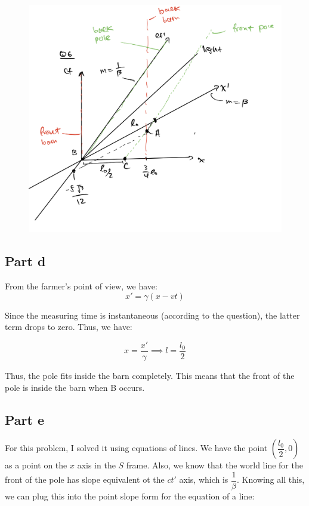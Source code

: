\documentclass{article}
\theoremstyle{definition}
\numberwithin{equation}{section}
\numberwithin{definition}{section}
\begin{document}
	\begin{figure}[H]
		\centering
		\includegraphics[scale=0.3]{Q6.jpg}
	\end{figure}
	\subsection{Part d}
	
	From the farmer's point of view, we have:
	\[x' = \gamma (x - vt)\]
	
	Since the measuring time is instantaneous (according to the question), the latter term drops to zero. Thus, we have:
	
	\[ x = \frac{x'}{\gamma} \implies l = \frac{l_0}{2}\]
	
	Thus, the pole fits inside the barn completely. This means that the front of the pole is inside the barn when B occurs.
	
	\subsection{Part e}
	For this problem, I solved it using equations of lines. We have the point $(\dfrac{l_0}{2}, 0)$ as a point on the $x$ axis in the $S$ frame. Also, we know that the world line for the front of the pole has slope equivalent ot the $ct'$ axis, which is $\dfrac{1}{\beta}$. Knowing all this, we can plug this into the point slope form for the equation of a line:
		
\end{document}
